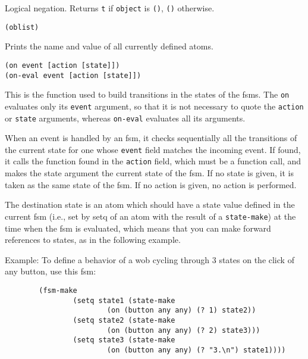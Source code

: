 Logical negation. Returns \verb"t" if \verb"object" is \verb"()",
\verb"()" otherwise.

        
{\usagefont\begin{verbatim}
(oblist)
\end{verbatim}}\usageupspace

Prints the name and value of all currently defined {\WOOL} atoms.

        
{\usagefont\begin{verbatim}
(on event [action [state]])
(on-eval event [action [state]])
\end{verbatim}}\usageupspace

This is the function used to build transitions in the states of the fsms.
The \verb"on" evaluates only its \verb"event" argument, so that it is not
necessary to quote the \verb"action" or \verb"state" arguments, whereas
\verb"on-eval" evaluates all its arguments.

When an event is handled by an fsm, it checks sequentially all the
transitions of the current state for one whose \verb"event" field matches
the incoming event. If found, it calls the {\WOOL} function found in the
\verb"action" field, which must be a function call, and makes the
state argument the current state of the fsm. If no  state is given, it is
taken as the same state of the fsm. If no action is given, no action is
performed.

The destination state is an atom which should have a state value defined in
the current fsm (i.e., set by setq of an atom 
with the result of a \verb"state-make") at
the time when the fsm is evaluated, which means that you can make forward
references to states, as in the following example.

Example: To define a behavior of a wob cycling through 3 states on the
click of any button, use this fsm:

{\exemplefont\begin{verbatim}
        (fsm-make 
                (setq state1 (state-make
                        (on (button any any) (? 1) state2))
                (setq state2 (state-make
                        (on (button any any) (? 2) state3)))
                (setq state3 (state-make
                        (on (button any any) (? "3.\n") state1))))
\end{verbatim}}

